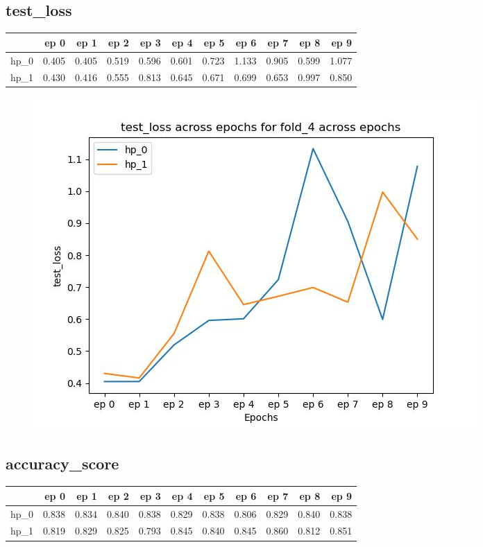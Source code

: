 \documentclass{article}
\begin{document}
\subsection{test\_loss}
\begin{tabular}{lrrrrrrrrrr}
\toprule
{} &   ep 0 &   ep 1 &   ep 2 &   ep 3 &   ep 4 &   ep 5 &   ep 6 &   ep 7 &   ep 8 &   ep 9 \\
\midrule
hp\_0 &  0.405 &  0.405 &  0.519 &  0.596 &  0.601 &  0.723 &  1.133 &  0.905 &  0.599 &  1.077 \\
hp\_1 &  0.430 &  0.416 &  0.555 &  0.813 &  0.645 &  0.671 &  0.699 &  0.653 &  0.997 &  0.850 \\
\bottomrule
\end{tabular}

\begin{figure}[H]
\includegraphics[scale = 0.75]{fold_4/test_loss}
\end{figure}
\subsection{accuracy\_score}
\begin{tabular}{lrrrrrrrrrr}
\toprule
{} &   ep 0 &   ep 1 &   ep 2 &   ep 3 &   ep 4 &   ep 5 &   ep 6 &   ep 7 &   ep 8 &   ep 9 \\
\midrule
hp\_0 &  0.838 &  0.834 &  0.840 &  0.838 &  0.829 &  0.838 &  0.806 &  0.829 &  0.840 &  0.838 \\
hp\_1 &  0.819 &  0.829 &  0.825 &  0.793 &  0.845 &  0.840 &  0.845 &  0.860 &  0.812 &  0.851 \\
\bottomrule
\end{tabular}
\end{document}
